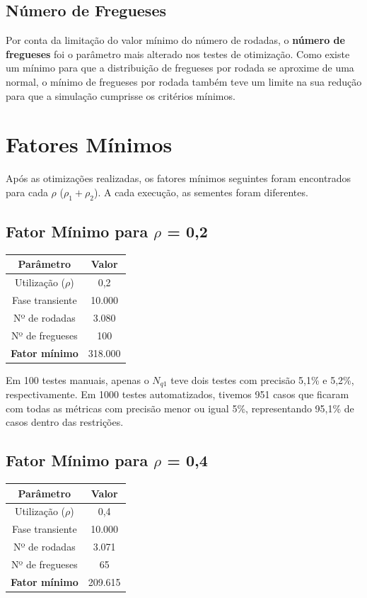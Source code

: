 \documentclass[a4paper,12pt]{report}
\begin{document}
\subsection{Número de Fregueses}

Por conta da limitação do valor mínimo do número de rodadas, o \textbf{número de fregueses} foi o parâmetro mais alterado nos testes de otimização. Como existe um mínimo para que a distribuição de fregueses por rodada se aproxime de uma normal, o mínimo de fregueses por rodada também teve um limite na sua redução para que a simulação cumprisse os critérios mínimos.

\section{Fatores Mínimos}

Após as otimizações realizadas, os fatores mínimos seguintes foram encontrados para cada $\rho$ ($\rho_1 + \rho_2$). A cada execução, as sementes foram diferentes.

\subsection{Fator Mínimo para $\rho$ = 0,2}
\begin{center}
\begin{tabular}{ c c }
  \hline
  \textbf{Parâmetro} & \textbf{Valor}\\
  \hline
  Utilização ($\rho$) & 0,2\\
  Fase transiente & 10.000\\
  Nº de rodadas & 3.080\\
  Nº de fregueses & 100\\
  \hline
  \textbf{Fator mínimo} & 318.000\\
  \hline
\end{tabular}
\end{center}

Em 100 testes manuais, apenas o $N_{q1}$ teve dois testes com precisão 5,1\% e 5,2\%, respectivamente. Em 1000 testes automatizados, tivemos 951 casos que ficaram com todas as métricas com precisão menor ou igual 5\%, representando 95,1\% de casos dentro das restrições.


\subsection{Fator Mínimo para $\rho$ = 0,4}
\begin{center}
\begin{tabular}{ c c }
  \hline
  \textbf{Parâmetro} & \textbf{Valor}\\
  \hline
  Utilização ($\rho$) & 0,4\\
  Fase transiente & 10.000\\
  Nº de rodadas & 3.071\\
  Nº de fregueses & 65\\
  \hline
  \textbf{Fator mínimo} & 209.615\\
  \hline
\end{tabular}
\end{center}
\end{document}
